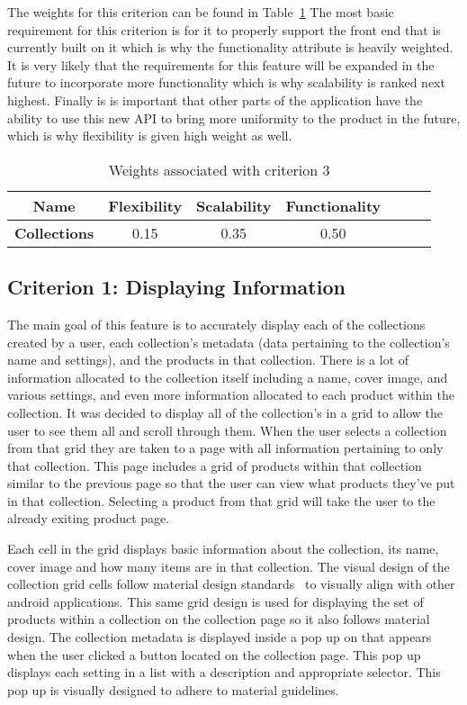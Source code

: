 \documentclass[12pt]{article}
\begin{document}
The weights for this criterion can be found in Table~\ref{table:3} The most basic requirement for this criterion is for it to properly support the front end that is currently built on it which is why the functionality attribute is heavily weighted. It is very likely that the requirements for this feature will be expanded in the future to incorporate more functionality which is why scalability is ranked next highest. Finally is is important that other parts of the application have the ability to use this new API to bring more uniformity to the product in the future, which is why flexibility is given high weight as well. 

\begin{table}[h!]
\centering
	\begin{tabular}{|c|c|c|c|c|c|c|} 
		\hline
		\textbf{Name} & \textbf{Flexibility} & \textbf{Scalability} & \textbf{Functionality}\\
		\hline
		\textbf{Collections} 			& 0.15 & 0.35 & 0.50\\
		\hline
	\end{tabular}
\caption{Weights associated with criterion 3}
\label{table:3}
\end{table}


\subsection{Criterion 1: Displaying Information} %
\label{sub:criterion_1_displaying_information}
The main goal of this feature is to accurately display each of the collections created by a user, each collection's metadata (data pertaining to the collection's name and settings), and the products in that collection. There is a lot of information allocated to the collection itself including a name, cover image, and various settings, and even more information allocated to each product within the collection. It was decided to display all of the collection's in a grid to allow the user to see them all and scroll through them. When the user selects a collection from that grid they are taken to a page with all information pertaining to only that collection. This page includes a grid of products within that collection similar to the previous page so that the user can view what products they've put in that collection. Selecting a product from that grid will take the user to the already exiting product page. 

Each cell in the grid displays basic information about the collection, its name, cover image and how many items are in that collection. The visual design of the collection grid cells follow material design standards~\cite{material} to visually align with other android applications. This same grid design is used for displaying the set of products within a collection on the collection page so it also follows material design. The collection metadata is displayed inside a pop up on that appears when the user clicked a button located on the collection page. This pop up displays each setting in a list with a description and appropriate selector. This pop up is visually designed to adhere to material guidelines. 
\end{document}
